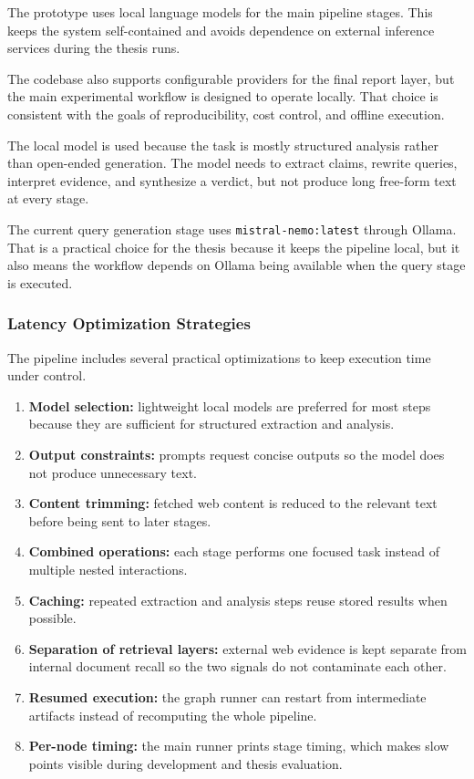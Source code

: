 The prototype uses local language models for the main pipeline stages. This keeps the system self-contained and avoids dependence on external inference services during the thesis runs.

The codebase also supports configurable providers for the final report layer, but the main experimental workflow is designed to operate locally. That choice is consistent with the goals of reproducibility, cost control, and offline execution.

The local model is used because the task is mostly structured analysis rather than open-ended generation. The model needs to extract claims, rewrite queries, interpret evidence, and synthesize a verdict, but not produce long free-form text at every stage.

The current query generation stage uses \texttt{mistral-nemo:latest} through Ollama. That is a practical choice for the thesis because it keeps the pipeline local, but it also means the workflow depends on Ollama being available when the query stage is executed.

\subsubsection{Latency Optimization Strategies}

The pipeline includes several practical optimizations to keep execution time under control.

\begin{enumerate}
    \item \textbf{Model selection:} lightweight local models are preferred for most steps because they are sufficient for structured extraction and analysis.
    \item \textbf{Output constraints:} prompts request concise outputs so the model does not produce unnecessary text.
    \item \textbf{Content trimming:} fetched web content is reduced to the relevant text before being sent to later stages.
    \item \textbf{Combined operations:} each stage performs one focused task instead of multiple nested interactions.
    \item \textbf{Caching:} repeated extraction and analysis steps reuse stored results when possible.
    \item \textbf{Separation of retrieval layers:} external web evidence is kept separate from internal document recall so the two signals do not contaminate each other.
    \item \textbf{Resumed execution:} the graph runner can restart from intermediate artifacts instead of recomputing the whole pipeline.
    \item \textbf{Per-node timing:} the main runner prints stage timing, which makes slow points visible during development and thesis evaluation.
\end{enumerate}

